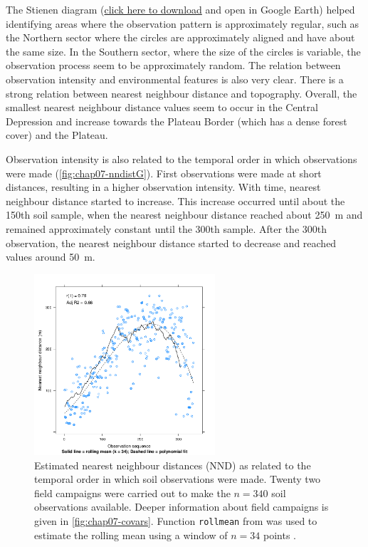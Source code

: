 \def\stienen{\href{https://www.dropbox.com/s/lyzcvwdie5rs8rr/stienen.kml?dl=0}{click here to download}}

The Stienen diagram (\stienen{} and open in Google Earth\rr{}) helped identifying areas where the observation 
pattern is approximately regular, such as the Northern sector where the circles are approximately aligned and 
have about the same size. In the Southern sector, where the size of the circles is variable, the observation 
process seem to be approximately random. The relation between observation intensity and environmental features 
is also very clear. There is a strong relation between nearest neighbour distance and topography. Overall, the 
smallest nearest neighbour distance values seem to occur in the Central Depression and increase towards the 
Plateau Border (which has a dense forest cover) and the Plateau.

Observation intensity is also related to the temporal order in which observations were made 
(\autoref{fig:chap07-nndistG}). First observations were made at short distances, resulting in a higher 
observation intensity. With time, nearest neighbour distance started to increase. This increase occurred until 
about the \num{150}th soil sample, when the nearest neighbour distance reached about \SI{250}{\m} and 
remained approximately constant until the \num{300}th sample. After the \num{300}th observation, the 
nearest neighbour distance started to decrease and reached values around \SI{50}{\m}.

\begin{figure}[!ht]
\centering
\includegraphics[trim=0mm 0mm 0mm 12mm, clip=true, width = 0.6\textwidth]{fig/chap07-nndistG}
\caption[Nearest neighbour distances and the order of soil observation.]{Estimated nearest neighbour distances 
(NND) as related to the temporal order in which soil observations were made. Twenty two field campaigns were 
carried out to make the $n = 340$ soil observations available. Deeper information about field campaigns is 
given in \autoref{fig:chap07-covars}. Function \texttt{rollmean} from  was used to estimate the 
rolling mean using a window of $n = 34$ points \cite{ZeileisEtAl2005}.}
\label{fig:chap07-nndistG}
\end{figure}


